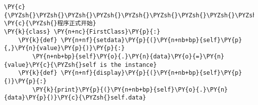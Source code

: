 \begin{Verbatim}[commandchars=\\\{\}]
\PY{c}{\PYZsh{}\PYZsh{}\PYZsh{}\PYZsh{}\PYZsh{}\PYZsh{}\PYZsh{}\PYZsh{}\PYZsh{}\PYZsh{}\PYZsh{}\PYZsh{}\PYZsh{}\PYZsh{}\PYZsh{}\PYZsh{}\PYZsh{}\PYZsh{}\PYZsh{}\PYZsh{}\PYZsh{}\PYZsh{}\PYZsh{}\PYZsh{}\PYZsh{}\PYZsh{}\PYZsh{}\PYZsh{}\PYZsh{}\PYZsh{}\PYZsh{}\PYZsh{}\PYZsh{}\PYZsh{}\PYZsh{}}
\PY{c}{\PYZsh{}程序正式开始}
\PY{k}{class} \PY{n+nc}{FirstClass}\PY{p}{:}
    \PY{k}{def} \PY{n+nf}{setdata}\PY{p}{(}\PY{n+nb+bp}{self}\PY{p}{,}\PY{n}{value}\PY{p}{)}\PY{p}{:}
        \PY{n+nb+bp}{self}\PY{o}{.}\PY{n}{data}\PY{o}{=}\PY{n}{value}\PY{c}{\PYZsh{}self is the instance}
    \PY{k}{def} \PY{n+nf}{display}\PY{p}{(}\PY{n+nb+bp}{self}\PY{p}{)}\PY{p}{:}
        \PY{k}{print}\PY{p}{(}\PY{n+nb+bp}{self}\PY{o}{.}\PY{n}{data}\PY{p}{)}\PY{c}{\PYZsh{}self.data}
\end{Verbatim}
